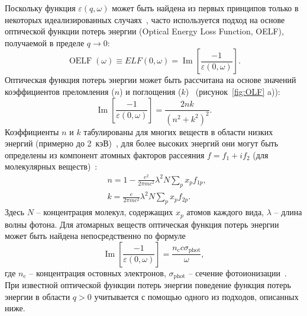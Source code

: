 Поскольку функция $\varepsilon(q, \omega)$ может быть найдена из первых принципов только в некоторых идеализированных случаях~\cite{Ritchie_ELF}, часто используется подход на основе оптической функции потерь энергии (Optical Energy Loss Function, OELF), получаемой в пределе $q \rightarrow 0$:
\begin{equation}
	\operatorname{OELF}(\omega) \equiv E L F(0, \omega)=\operatorname{Im}\left[\frac{-1}{\varepsilon(0, \omega)}\right].
\end{equation}
Оптическая функция потерь энергии может быть рассчитана на основе значений коэффициентов преломления ($n$) и поглощения ($k$)~\cite{Dapor_2015_oscillators} (рисунок~\ref{fig:OLF} a)):
\begin{equation}
	\operatorname{Im}\left[\frac{-1}{\varepsilon(0, \omega)}\right]=\frac{2 n k}{\left(n^2+k^2\right)^2}.
\end{equation}
Коэффициенты $n$ и $k$ табулированы для многих веществ в области низких энергий (примерно до 2~кэВ)~\cite{Palik}, для более высоких энергий они могут быть определены из компонент атомных факторов рассеяния $f = f_1 + i f_2$ (для молекулярных веществ)~\cite{Henke_photoabs}:
\begin{equation}
	\begin{aligned}
		&n=1-\frac{e^2}{2 \pi m c^2} \lambda^2 N \sum_p x_p f_{1 p}, \\
		&k=\frac{e}{2 \pi m c^2} \lambda^2 N \sum_p x_p f_{2 p}.
	\end{aligned}
\end{equation}
Здесь $N$ -- концентрация молекул, содержащих $x_p$ атомов каждого вида, $\lambda$ -- длина волны фотона. Для атомарных веществ оптическая функция потерь энергии может быть найдена непосредственно по формуле
\begin{equation}
	\operatorname{Im}\left[\frac{-1}{\varepsilon(0, \omega)}\right]=\frac{n_\mathrm{c} c \sigma_\mathrm{phot}}{\omega},
\end{equation}
где $n_\mathrm{c}$ -- концентрация остовных электронов, $\sigma_\mathrm{phot}$ --  сечение фотоионизации~\cite{Biggs_cs}. При известной оптической функции потерь энергии поведение функция потерь энергии в области $q > 0$ учитывается с помощью одного из подходов, описанных ниже.


